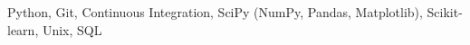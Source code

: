 \begin{cvskills}
  \cvskill
    {Python, Git, Continuous Integration, SciPy (NumPy, Pandas, Matplotlib), Scikit-learn, Unix, SQL}
    {} %

\end{cvskills}

